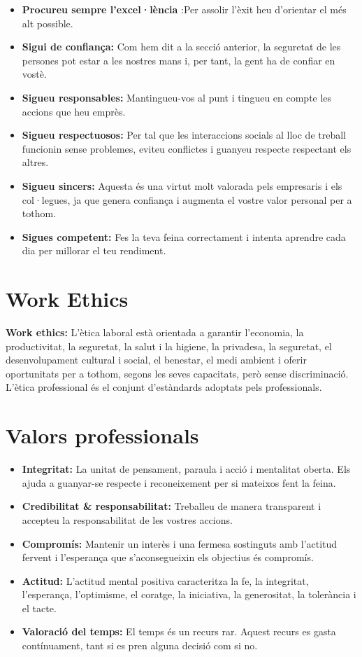 \documentclass[12pt, a4papre]{article}
\begin{document}
	\begin{itemize}
		\item \textbf{Procureu sempre l’excel·lència } :Per assolir l’èxit heu d’orientar el més alt possible.
		\item \textbf{Sigui de confiança:} Com hem dit a la secció anterior, la seguretat de les persones pot estar a les nostres mans i, per tant, la gent ha de confiar en vostè.
		\item \textbf{Sigueu responsables:} Mantingueu-vos al punt i tingueu en compte les accions que heu emprès.		\item \textbf{Sigueu respectuosos:} Per tal que les interaccions socials al lloc de treball funcionin sense problemes, eviteu conflictes i guanyeu respecte respectant els altres.
		\item \textbf{Sigueu sincers:} Aquesta és una virtut molt valorada pels empresaris i els col·legues, ja que genera confiança i augmenta el vostre valor personal per a tothom.		
		\item \textbf{Sigues competent:} Fes la teva feina correctament i intenta aprendre cada dia per millorar el teu rendiment.	
		\end{itemize}
	
	\section{Work Ethics}
	
	\textbf{Work ethics:}  L’ètica laboral està orientada a garantir l’economia, la productivitat, la seguretat, la salut i la higiene, la privadesa, la seguretat, el desenvolupament cultural i social, el benestar, el medi ambient i oferir oportunitats per a tothom, segons les seves capacitats, però sense discriminació. L’ètica professional és el conjunt d’estàndards adoptats pels professionals.
	
	\section{Valors professionals}
	
	\begin{itemize}
		\item \textbf{Integritat:} La unitat de pensament, paraula i acció i mentalitat oberta. Els ajuda a guanyar-se respecte i reconeixement per si mateixos fent la feina.		
		\item \textbf{Credibilitat  \& responsabilitat:} Treballeu de manera transparent i accepteu la responsabilitat de les vostres accions.		
		\item \textbf{Compromís:} Mantenir un interès i una fermesa sostinguts amb l’actitud fervent i l’esperança que s’aconsegueixin els objectius és compromís.		
		\item \textbf{Actitud:} L’actitud mental positiva caracteritza la fe, la integritat, l’esperança, l’optimisme, el coratge, la iniciativa, la generositat, la tolerància i el tacte.		
		\item \textbf{Valoració del temps:} El temps és un recurs rar. Aquest recurs es gasta contínuament, tant si es pren alguna decisió com si no.
	\end{itemize}
	
\end{document}
